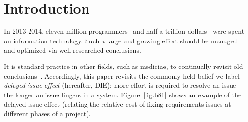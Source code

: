 \documentclass[smallcondensed]{svjour3}
\newcommand{\fig}[1]{Figure~\ref{fig:#1}}
\begin{document}
\section{Introduction}
In 2013-2014, 
eleven  million programmers~\cite{avram14} and
half a trillion dollars~\cite{pettey14} were spent on information technology.
Such a large and growing effort should be managed and optimized via  well-researched conclusions.  

It is standard practice
in other fields, such as medicine,
to continually revisit old conclusions~\cite{prasad13}.
Accordingly, this paper revisits
the commonly held belief we label {\em delayed issue effect} (hereafter, DIE):
more effort is required to resolve an issue the longer an issue lingers in a system.
 \fig{b81} shows an example of the delayed issue effect (relating
 the relative cost of fixing requirements issues at different phases of a project).
 
\end{document}
